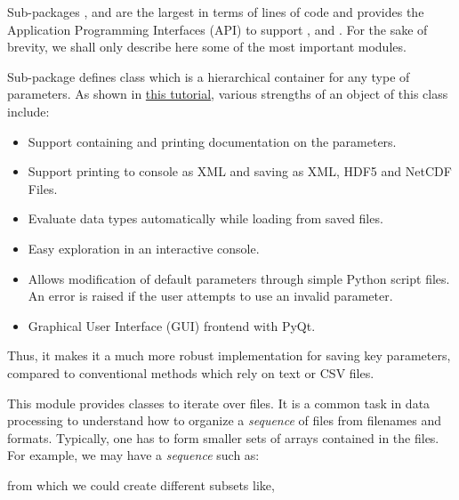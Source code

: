 Sub-packages ,  and  are the
largest in terms of lines of code and provides the Application Programming
Interfaces (API) to support ,  and
.
%
For the sake of brevity, we shall only describe here some of the most important
modules.


Sub-package  defines class
 which is a hierarchical container for any type of
parameters. As shown in
\href{http://fluiddyn.readthedocs.io/en/latest/ipynb/tuto_paramscontainer.html}{%
this tutorial}, various strengths of an object of this class include:
\begin{itemize}
\item Support containing and printing documentation on the parameters.
\item Support printing to console as XML and saving as XML, HDF5 and NetCDF
Files.
\item Evaluate data types automatically while loading from saved files.
\item Easy exploration in an interactive console.
\item Allows modification of default parameters through simple Python script
files. An error is raised if the user attempts to use an invalid parameter.
\item Graphical User Interface (GUI) frontend with PyQt.
\end{itemize}

Thus, it makes it a much more robust implementation for saving key parameters,
compared to conventional methods which rely on text or CSV files.


This module provides classes to iterate over files. It is a common task in data
processing to understand how to organize a \textit{sequence} of files from
filenames and formats. Typically, one has to form smaller sets of arrays
contained in the files. For example, we may have a \textit{sequence} such as:


from which we could create different subsets like,

